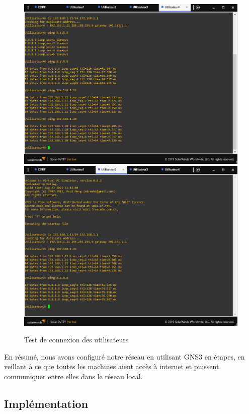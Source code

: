\begin{figure}[H]
 \centering
    \includegraphics[width=15.5cm]{Images/BRades-Topologie8.png}
    \includegraphics[width=15.5cm]{Images/BRades-Topologie9.png}
    \caption{Test de connexion des utilisateurs}
    \label{Chap2.2.7}
\end{figure}


En résumé, nous avons configuré notre réseau en utilisant GNS3 en étapes, en veillant à ce que toutes les machines aient accès à internet et puissent communiquer entre elles dans le réseau local.


  
\subsection{Implémentation}

